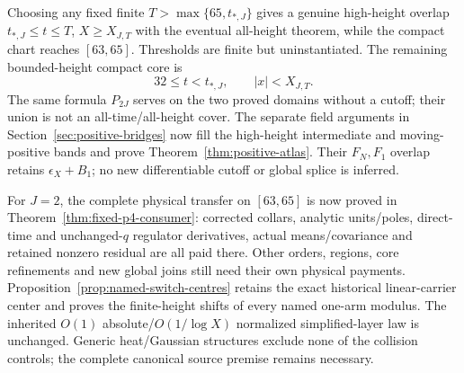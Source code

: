 Choosing any fixed finite $T>\max\{65,t_{*,J}\}$ gives a genuine
high-height overlap $t_{*,J}\le t\le T$, $X\ge X_{J,T}$ with the
eventual all-height theorem, while the compact chart reaches
$[63,65]$. Thresholds are finite but uninstantiated. The remaining
bounded-height compact core is
\[
 32\le t<t_{*,J},\qquad |x|<X_{J,T}.
\]
The same formula $P_{2J}$ serves on the two proved domains without a
cutoff; their union is not an all-time/all-height cover. The separate
field arguments in Section~\ref{sec:positive-bridges} now fill the
high-height intermediate and moving-positive bands and prove
Theorem~\ref{thm:positive-atlas}. Their $F_N,F_1$ overlap retains
$\epsilon_X+B_1$; no new differentiable cutoff or global splice is inferred.

For $J=2$, the complete physical transfer on $[63,65]$ is now proved
in Theorem~\ref{thm:fixed-p4-consumer}: corrected collars, analytic
units/poles, direct-time and unchanged-$q$ regulator derivatives, actual
means/covariance and retained nonzero residual are all paid there.
Other orders, regions, core refinements and new global joins still
need their own physical payments. Proposition~\ref{prop:named-switch-centres}
retains the exact historical linear-carrier center and proves the
finite-height shifts of every named one-arm modulus. The inherited
$O(1)$ absolute/$O(1/\log X)$ normalized simplified-layer law is
unchanged. Generic heat/Gaussian structures exclude none of the
collision controls; the complete canonical source premise remains
necessary.
